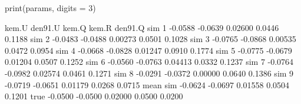 \begin{Schunk}
\begin{Sinput}
 print(params, digits = 3)
\end{Sinput}
\begin{Soutput}
           kem.U den91.U   kem.Q  kem.R den91.Q
sim 1    -0.0588 -0.0639 0.02600 0.0446  0.1188
sim 2    -0.0483 -0.0488 0.00273 0.0501  0.1028
sim 3    -0.0765 -0.0868 0.00535 0.0472  0.0954
sim 4    -0.0668 -0.0828 0.01247 0.0910  0.1774
sim 5    -0.0775 -0.0679 0.01204 0.0507  0.1252
sim 6    -0.0560 -0.0763 0.04413 0.0332  0.1237
sim 7    -0.0764 -0.0982 0.02574 0.0461  0.1271
sim 8    -0.0291 -0.0372 0.00000 0.0640  0.1386
sim 9    -0.0719 -0.0651 0.01179 0.0268  0.0715
mean sim -0.0624 -0.0697 0.01558 0.0504  0.1201
true     -0.0500 -0.0500 0.02000 0.0500  0.0200
\end{Soutput}
\end{Schunk}
